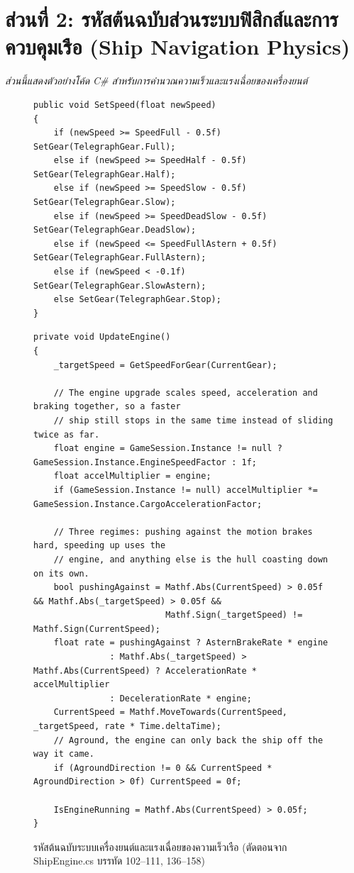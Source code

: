 \section*{ส่วนที่ 2: รหัสต้นฉบับส่วนระบบฟิสิกส์และการควบคุมเรือ (Ship Navigation Physics)}
\textit{ส่วนนี้แสดงตัวอย่างโค้ด C\# สำหรับการคำนวณความเร็วและแรงเฉื่อยของเครื่องยนต์}


\begin{figure}[H]
\centering
\begin{lstlisting}[language={[Sharp]C},basicstyle=\ttfamily\scriptsize,firstnumber=102]
public void SetSpeed(float newSpeed)
{
    if (newSpeed >= SpeedFull - 0.5f) SetGear(TelegraphGear.Full);
    else if (newSpeed >= SpeedHalf - 0.5f) SetGear(TelegraphGear.Half);
    else if (newSpeed >= SpeedSlow - 0.5f) SetGear(TelegraphGear.Slow);
    else if (newSpeed >= SpeedDeadSlow - 0.5f) SetGear(TelegraphGear.DeadSlow);
    else if (newSpeed <= SpeedFullAstern + 0.5f) SetGear(TelegraphGear.FullAstern);
    else if (newSpeed < -0.1f) SetGear(TelegraphGear.SlowAstern);
    else SetGear(TelegraphGear.Stop);
}
\end{lstlisting}
\vspace{0.3em}
\begin{lstlisting}[language={[Sharp]C},basicstyle=\ttfamily\scriptsize,firstnumber=136]
private void UpdateEngine()
{
    _targetSpeed = GetSpeedForGear(CurrentGear);

    // The engine upgrade scales speed, acceleration and braking together, so a faster
    // ship still stops in the same time instead of sliding twice as far.
    float engine = GameSession.Instance != null ? GameSession.Instance.EngineSpeedFactor : 1f;
    float accelMultiplier = engine;
    if (GameSession.Instance != null) accelMultiplier *= GameSession.Instance.CargoAccelerationFactor;

    // Three regimes: pushing against the motion brakes hard, speeding up uses the
    // engine, and anything else is the hull coasting down on its own.
    bool pushingAgainst = Mathf.Abs(CurrentSpeed) > 0.05f && Mathf.Abs(_targetSpeed) > 0.05f &&
                          Mathf.Sign(_targetSpeed) != Mathf.Sign(CurrentSpeed);
    float rate = pushingAgainst ? AsternBrakeRate * engine
               : Mathf.Abs(_targetSpeed) > Mathf.Abs(CurrentSpeed) ? AccelerationRate * accelMultiplier
               : DecelerationRate * engine;
    CurrentSpeed = Mathf.MoveTowards(CurrentSpeed, _targetSpeed, rate * Time.deltaTime);
    // Aground, the engine can only back the ship off the way it came.
    if (AgroundDirection != 0 && CurrentSpeed * AgroundDirection > 0f) CurrentSpeed = 0f;

    IsEngineRunning = Mathf.Abs(CurrentSpeed) > 0.05f;
}
\end{lstlisting}
\caption{รหัสต้นฉบับระบบเครื่องยนต์และแรงเฉื่อยของความเร็วเรือ (ตัดตอนจาก ShipEngine.cs บรรทัด 102--111, 136--158)}
\label{fig:code_engine}
\end{figure}
